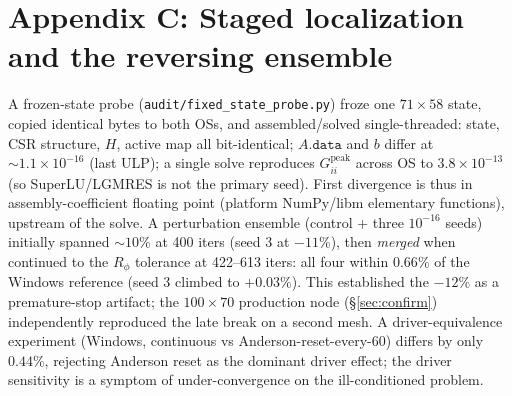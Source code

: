 \documentclass[11pt]{article}
\newcommand{\ten}[1]{\times 10^{#1}}
\begin{document}
\section*{Appendix C: Staged localization and the reversing ensemble}
A frozen-state probe (\texttt{audit/fixed\_state\_probe.py}) froze one $71\times58$ state, copied identical bytes to both OSs, and assembled/solved single-threaded: state, CSR structure, $H$, active map all bit-identical; $A.\mathtt{data}$ and $b$ differ at $\sim\!1.1\ten{-16}$ (last ULP); a single solve reproduces $G_{ii}^{\mathrm{peak}}$ across OS to $3.8\ten{-13}$ (so SuperLU/LGMRES is not the primary seed). First divergence is thus in assembly-coefficient floating point (platform NumPy/libm elementary functions), upstream of the solve. A perturbation ensemble (control + three $10^{-16}$ seeds) initially spanned $\sim\!10\%$ at 400 iters (seed 3 at $-11\%$), then \emph{merged} when continued to the $R_\phi$ tolerance at 422--613 iters: all four within $0.66\%$ of the Windows reference (seed 3 climbed to $+0.03\%$). This established the $-12\%$ as a premature-stop artifact; the $100\times70$ production node (\S\ref{sec:confirm}) independently reproduced the late break on a second mesh. A driver-equivalence experiment (Windows, continuous vs Anderson-reset-every-60) differs by only $0.44\%$, rejecting Anderson reset as the dominant driver effect; the driver sensitivity is a symptom of under-convergence on the ill-conditioned problem.
\end{document}
